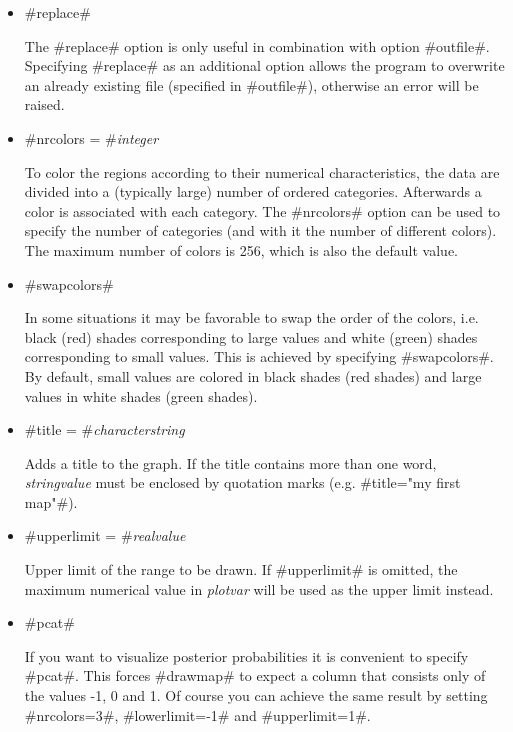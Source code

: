 \begin{itemize}
\item #replace#

The #replace# option is only useful in combination with option
#outfile#. Specifying #replace# as an additional option allows the
program to overwrite an already existing file (specified in
#outfile#), otherwise an error will be raised.

\item #nrcolors = #{\em integer}

To color the regions according to their numerical characteristics,
the data are divided into a (typically large) number of ordered
categories. Afterwards a color is associated with each category.
The #nrcolors# option can be used to specify the number of
categories (and with it the number of different colors). The
maximum number of colors is 256, which is also the default value.

\item #swapcolors#

In some situations it may be favorable to swap the order of the
colors, i.e. black (red) shades corresponding to large values and
white (green) shades corresponding to small values. This is
achieved by specifying #swapcolors#. By default, small values are
colored in black shades (red shades) and large values in white
shades (green shades).

\item #title = #{\em characterstring}

Adds a title to the graph. If the title contains more than one
word, {\em stringvalue} must be enclosed by quotation marks (e.g.
#title="my first map"#).

\item #upperlimit = #{\em realvalue}

Upper limit of the range to be drawn. If #upperlimit# is omitted,
the maximum numerical value in {\em plotvar} will be used as the
upper limit instead.

\item #pcat#

If you want to visualize posterior probabilities it is convenient
to specify #pcat#. This forces #drawmap# to expect a column that
consists only of the values -1, 0 and 1. Of course you can achieve
the same result by setting #nrcolors=3#, #lowerlimit=-1# and
#upperlimit=1#.
\end{itemize}


